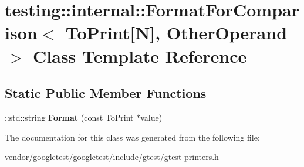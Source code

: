 \hypertarget{classtesting_1_1internal_1_1FormatForComparison_3_01ToPrint[N]_00_01OtherOperand_01_4}{}\section{testing\+:\+:internal\+:\+:Format\+For\+Comparison$<$ To\+Print\mbox{[}N\mbox{]}, Other\+Operand $>$ Class Template Reference}
\label{classtesting_1_1internal_1_1FormatForComparison_3_01ToPrint[N]_00_01OtherOperand_01_4}
\subsection*{Static Public Member Functions}
\begin{DoxyCompactItemize}
\item 
\+::std\+::string {\bfseries Format} (const To\+Print $\ast$value)\hypertarget{classtesting_1_1internal_1_1FormatForComparison_3_01ToPrint[N]_00_01OtherOperand_01_4_a76c526461c8fa7df75f7b32ab889b9e0}{}\label{classtesting_1_1internal_1_1FormatForComparison_3_01ToPrint[N]_00_01OtherOperand_01_4_a76c526461c8fa7df75f7b32ab889b9e0}

\end{DoxyCompactItemize}


The documentation for this class was generated from the following file\+:\begin{DoxyCompactItemize}
\item 
vendor/googletest/googletest/include/gtest/gtest-\/printers.\+h\end{DoxyCompactItemize}
